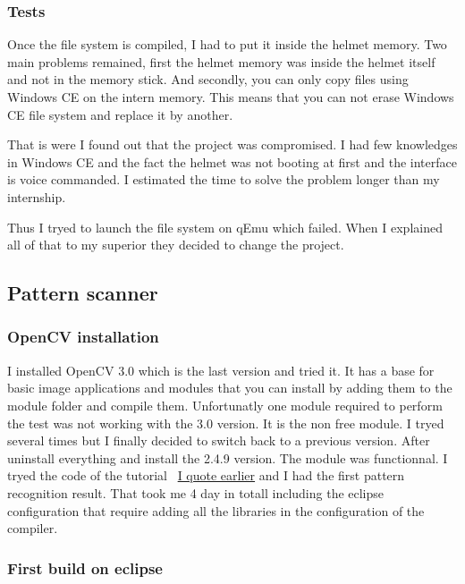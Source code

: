 	
	\subsubsection{Tests}
	
	\par Once the file system is compiled, I had to put it inside the helmet memory. Two main problems remained, first the helmet memory was inside the helmet itself and not in the memory stick. And secondly, you can only copy files using Windows CE on the intern memory. This means that you can not erase Windows CE file system and replace it by another.
	\par That is were I found out that the project was compromised. I had few knowledges in Windows CE and the fact the helmet was not booting at first and the interface is voice commanded. I estimated the time to solve the problem longer than my internship.
	\par Thus I tryed to launch the file system on qEmu which failed. When I explained all of that to my superior they decided to change the project.
	
	\subsection{Pattern scanner}
	\subsubsection{OpenCV installation}

	\par I installed OpenCV 3.0 which is the last version and tried it. It has a base for basic image applications and modules that you can install by adding them to the module folder and compile them. Unfortunatly one module required to perform the test was not working with the 3.0 version. It is the non free module. I tryed several times but I finally decided to switch back to a previous version. After uninstall everything and install the 2.4.9 version. The module was functionnal. I tryed the code of the tutorial ~\hyperlink{opencv}{I quote earlier} and I had the first pattern recognition result. That took me 4 day in totall including the eclipse configuration that require adding all the libraries in the configuration of the compiler.
	
	\subsubsection{First build on eclipse}	
	
